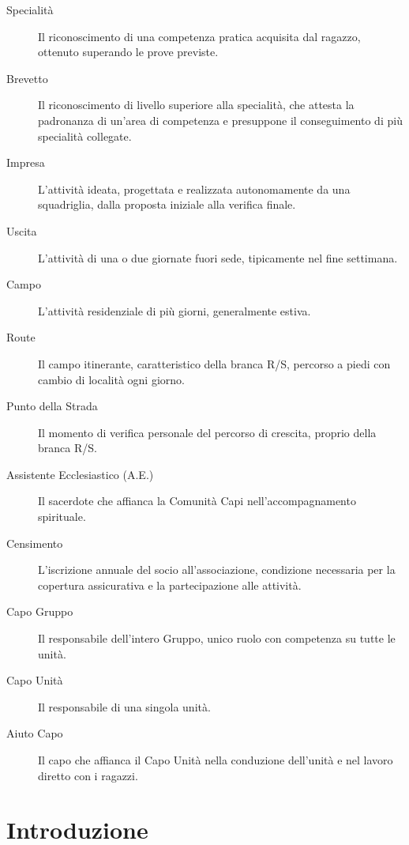 \documentclass[11pt]{article}
\numberwithin{figure}{section}
\begin{document}
\begin{description}
\item[Specialità] Il riconoscimento di una competenza pratica acquisita dal
ragazzo, ottenuto superando le prove previste.

\item[Brevetto] Il riconoscimento di livello superiore alla specialità, che
attesta la padronanza di un'area di competenza e presuppone il conseguimento
di più specialità collegate.

\item[Impresa] L'attività ideata, progettata e realizzata autonomamente da una
squadriglia, dalla proposta iniziale alla verifica finale.

\item[Uscita] L'attività di una o due giornate fuori sede, tipicamente nel
fine settimana.

\item[Campo] L'attività residenziale di più giorni, generalmente estiva.

\item[Route] Il campo itinerante, caratteristico della branca R/S, percorso a
piedi con cambio di località ogni giorno.

\item[Punto della Strada] Il momento di verifica personale del percorso di
crescita, proprio della branca R/S.

\item[Assistente Ecclesiastico (A.E.)] Il sacerdote che affianca la Comunità
Capi nell'accompagnamento spirituale.

\item[Censimento] L'iscrizione annuale del socio all'associazione, condizione
necessaria per la copertura assicurativa e la partecipazione alle attività.

\item[Capo Gruppo] Il responsabile dell'intero Gruppo, unico ruolo con
competenza su tutte le unità.

\item[Capo Unità] Il responsabile di una singola unità.

\item[Aiuto Capo] Il capo che affianca il Capo Unità nella conduzione
dell'unità e nel lavoro diretto con i ragazzi.

\end{description}

\newpage

\section{Introduzione}
\end{document}
